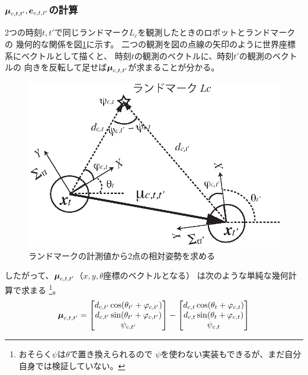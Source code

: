 

\subsubsection{$\boldsymbol{\mu}_{c,t,t'}, \boldsymbol{e}_{c,t,t'}$の計算}

2つの時刻$t,t'$で同じランドマーク$L_c$を観測したときのロボットとランドマークの
幾何的な関係を図\ref{fig:two_poses}に示す。
二つの観測を図の点線の矢印のように世界座標系にベクトルとして描くと、
時刻$t$の観測のベクトルに、時刻$t'$の観測のベクトルの
向きを反転して足せば$\boldsymbol{\mu}_{c,t,t'}$が求まることが分かる。


\begin{figure}[htbp]
	\begin{center}
		\includegraphics[width=0.5\linewidth]{./figs/two_poses.eps}
		\caption{ランドマークの計測値から2点の相対姿勢を求める}
		\label{fig:two_poses}
	\end{center}
\end{figure}

したがって、$\boldsymbol{\mu}_{c,t,t'}$（$x,y,\theta$座標のベクトルとなる）
は次のような単純な幾何計算で求まる
\footnote{おそらく$\psi$は$\theta$で置き換えられるので
$\psi$を使わない実装もできるが、まだ自分自身では検証していない。}。
\begin{align}
	\boldsymbol{\mu}_{c,t,t'} =
	\begin{bmatrix}
	d_{c,t'} \cos(\theta_{t'} + \varphi_{c,t'}) \\
	d_{c,t'} \sin(\theta_{t'} + \varphi_{c,t'}) \\
	\psi_{c,t'}
	\end{bmatrix}
	- 
	\begin{bmatrix}
	d_{c,t} \cos(\theta_t + \varphi_{c,t}) \\
	d_{c,t} \sin(\theta_t + \varphi_{c,t}) \\
	\psi_{c,t}
	\end{bmatrix}
\end{align}

